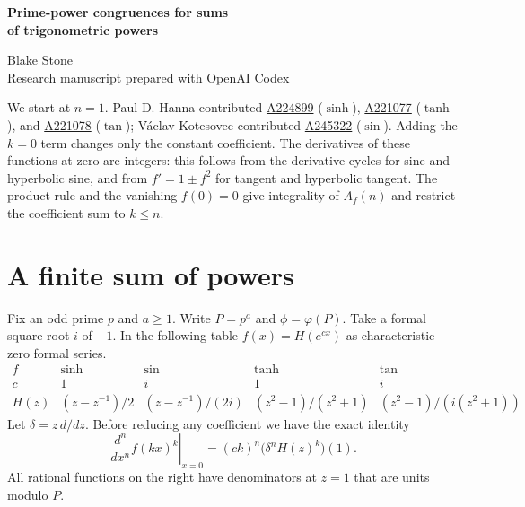 \documentclass[11pt,letterpaper]{article}
\newcommand{\oeis}[1]{\href{https://oeis.org/A#1}{A#1}}
\begin{document}
\thispagestyle{plain}
\begin{center}
{\LARGE\bfseries Prime-power congruences for sums\\[0.12em] of trigonometric powers\par}
\vspace{0.5em}
Blake Stone\\
{\small Research manuscript prepared with OpenAI Codex}
\end{center}

\begin{abstract}
For $f=\sin,\tan,\sinh,\tanh$, let $A_f(n)$ be the $n$th exponential coefficient of $\sum_{k\ge1} f(kx)^k$. At every odd prime power $p^a$, with $\phi=p^{a-1}(p-1)$, the hyperbolic sequences repeat after $\phi$ steps from $n=a$ on. The circular sequences satisfy $A_f(n+\phi)=(-1)^{\phi/2}A_f(n)$ modulo $p^a$. At $p=2$, sine and hyperbolic sine have alternating parity; tangent and hyperbolic tangent are even at every index past the first. These formulas give periods in four questions of Peter Bala and distinguish the exceptional prime in the tangent question.
\end{abstract}

We start at $n=1$. Paul D. Hanna contributed \oeis{224899} ($\sinh$), \oeis{221077} ($\tanh$), and \oeis{221078} ($\tan$); V\'aclav Kotesovec contributed \oeis{245322} ($\sin$). Adding the $k=0$ term changes only the constant coefficient. The derivatives of these functions at zero are integers: this follows from the derivative cycles for sine and hyperbolic sine, and from $f'=1\pm f^2$ for tangent and hyperbolic tangent. The product rule and the vanishing $f(0)=0$ give integrality of $A_f(n)$ and restrict the coefficient sum to $k\le n$.

\section{A finite sum of powers}
Fix an odd prime $p$ and $a\ge1$. Write $P=p^a$ and $\phi=\varphi(P)$. Take a formal square root $i$ of $-1$. In the following table $f(x)=H(e^{cx})$ as characteristic-zero formal series.
\[
\begin{array}{c|cccc}
 f&\sinh&\sin&\tanh&\tan\\ \hline
 c&1&i&1&i\\
 H(z)&(z-z^{-1})/2&(z-z^{-1})/(2i)&
 (z^2-1)/(z^2+1)&(z^2-1)/(i(z^2+1))
\end{array}
\]
Let $\delta=z\,d/dz$. Before reducing any coefficient we have the exact identity
\[
 \left.\frac{d^n}{dx^n}f(kx)^k\right|_{x=0}
     =(ck)^n\bigl(\delta^n H(z)^k\bigr)(1).
\]
All rational functions on the right have denominators at $z=1$ that are units modulo $P$.
\end{document}
